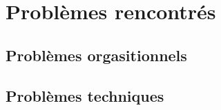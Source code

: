\section{Problèmes rencontrés}
\subsection{Problèmes orgasitionnels}
\subsection{Problèmes techniques}
